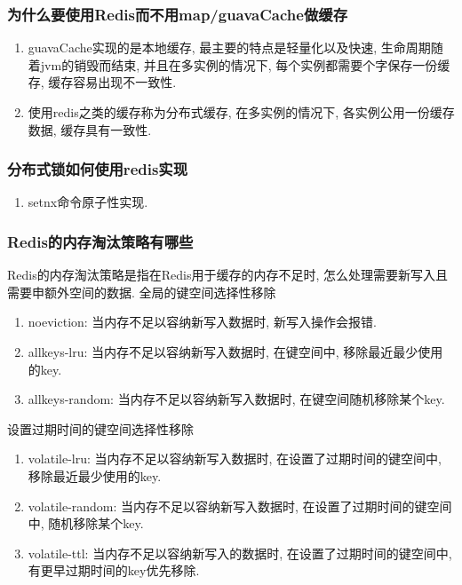 \documentclass[UTF8]{ctexart}
\begin{document}
\subsubsection{为什么要使用Redis而不用map/guavaCache做缓存}
\begin{enumerate}
	\item guavaCache实现的是本地缓存, 最主要的特点是轻量化以及快速, 生命周期随着jvm的销毁而结束, 并且在多实例的情况下, 每个实例都需要个字保存一份缓存, 缓存容易出现不一致性.
	\item 使用redis之类的缓存称为分布式缓存, 在多实例的情况下, 各实例公用一份缓存数据, 缓存具有一致性.
\end{enumerate}
\subsubsection{分布式锁如何使用redis实现}
\begin{enumerate}
	\item setnx命令原子性实现.
\end{enumerate}
\subsubsection{Redis的内存淘汰策略有哪些}
Redis的内存淘汰策略是指在Redis用于缓存的内存不足时, 怎么处理需要新写入且需要申额外空间的数据.
全局的键空间选择性移除
\begin{enumerate}

	\item noeviction: 当内存不足以容纳新写入数据时, 新写入操作会报错.
	\item allkeys-lru: 当内存不足以容纳新写入数据时, 在键空间中, 移除最近最少使用的key.
	\item allkeys-random: 当内存不足以容纳新写入数据时, 在键空间随机移除某个key.
\end{enumerate}
设置过期时间的键空间选择性移除
\begin{enumerate}

	\item volatile-lru: 当内存不足以容纳新写入数据时, 在设置了过期时间的键空间中, 移除最近最少使用的key.
	\item volatile-random: 当内存不足以容纳新写入数据时, 在设置了过期时间的键空间中, 随机移除某个key.
	\item volatile-ttl: 当内存不足以容纳新写入的数据时, 在设置了过期时间的键空间中, 有更早过期时间的key优先移除.
\end{enumerate}
\end{document}
